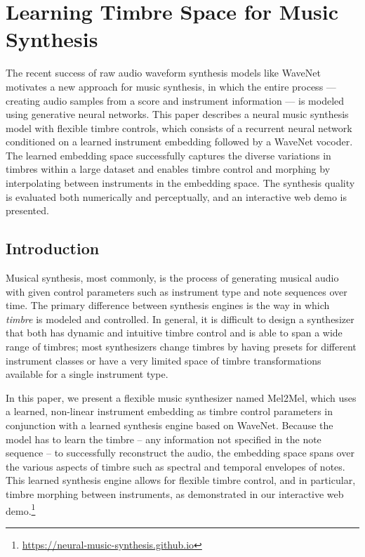 
\graphicspath{{5-synthesis/figures/}}

\chapter{Learning Timbre Space for Music Synthesis}
\label{ch:synthesis}

The recent success of raw audio waveform synthesis models like WaveNet motivates a new approach for music synthesis, in which the entire process --- creating audio samples from a score and instrument information --- is modeled using generative neural networks.
This paper describes a neural music synthesis model with flexible timbre controls, which consists of a recurrent neural network conditioned on a learned instrument embedding followed by a WaveNet vocoder.
The learned embedding space successfully captures the diverse variations in timbres within a large dataset and enables timbre control and morphing by interpolating between instruments in the embedding space.
The synthesis quality is evaluated both numerically and perceptually, and an interactive web demo is presented.


\section{Introduction}

Musical synthesis, most commonly, is the process of generating musical audio with given control parameters such as instrument type and note sequences over time.
The primary difference between synthesis engines is the way in which \emph{timbre} is modeled and controlled.
In general, it is difficult to design a synthesizer that both has dynamic and intuitive timbre control and is able to span a wide range of timbres; most synthesizers change timbres by having presets for different instrument classes or have a very limited space of timbre transformations available for a single instrument type.

In this paper, we present a flexible music synthesizer named Mel2Mel, which uses a learned, non-linear instrument embedding as timbre control parameters in conjunction with a learned synthesis engine based on WaveNet.
Because the model has to learn the timbre -- any information not specified in the note sequence -- to successfully reconstruct the audio, the embedding space spans over the various aspects of timbre such as spectral and temporal envelopes of notes.
This learned synthesis engine allows for flexible timbre control, and in particular, timbre morphing between instruments, as demonstrated in our interactive web demo.\footnote{\url{https://neural-music-synthesis.github.io}}

